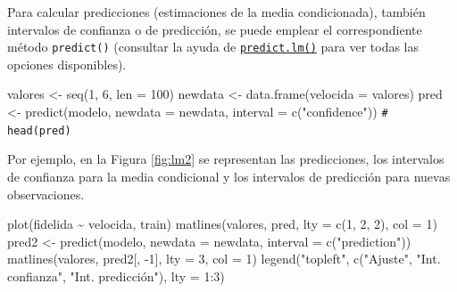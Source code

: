 \documentclass[
]{book}
\newenvironment{Shaded}{\begin{snugshade}}{\end{snugshade}}
\newcommand{\AttributeTok}[1]{\textcolor[rgb]{0.77,0.63,0.00}{#1}}
\newcommand{\CommentTok}[1]{\textcolor[rgb]{0.56,0.35,0.01}{\textit{#1}}}
\newcommand{\DecValTok}[1]{\textcolor[rgb]{0.00,0.00,0.81}{#1}}
\newcommand{\FunctionTok}[1]{\textcolor[rgb]{0.00,0.00,0.00}{#1}}
\newcommand{\NormalTok}[1]{#1}
\newcommand{\OtherTok}[1]{\textcolor[rgb]{0.56,0.35,0.01}{#1}}
\newcommand{\SpecialCharTok}[1]{\textcolor[rgb]{0.00,0.00,0.00}{#1}}
\newcommand{\StringTok}[1]{\textcolor[rgb]{0.31,0.60,0.02}{#1}}
\theoremstyle{break}
\theoremstyle{nonumberplain}
\renewcommand{\CommentTok}[1]{\textcolor[rgb]{0.41,0.41,0.41}{\texttt{#1}}}
\begin{document}
Para calcular predicciones (estimaciones de la media condicionada), también intervalos de confianza o de predicción, se puede emplear el correspondiente método \texttt{predict()} (consultar la ayuda de \href{https://rdrr.io/r/stats/predict.lm.html}{\texttt{predict.lm()}} para ver todas las opciones disponibles).

\begin{Shaded}
\begin{Highlighting}[]
\NormalTok{valores }\OtherTok{\textless{}{-}} \FunctionTok{seq}\NormalTok{(}\DecValTok{1}\NormalTok{, }\DecValTok{6}\NormalTok{, }\AttributeTok{len =} \DecValTok{100}\NormalTok{)}
\NormalTok{newdata }\OtherTok{\textless{}{-}} \FunctionTok{data.frame}\NormalTok{(}\AttributeTok{velocida =}\NormalTok{ valores)}
\NormalTok{pred }\OtherTok{\textless{}{-}} \FunctionTok{predict}\NormalTok{(modelo, }\AttributeTok{newdata =}\NormalTok{ newdata, }\AttributeTok{interval =} \FunctionTok{c}\NormalTok{(}\StringTok{"confidence"}\NormalTok{))}
\CommentTok{\# head(pred)}
\end{Highlighting}
\end{Shaded}

Por ejemplo, en la Figura \ref{fig:lm2} se representan las predicciones, los intervalos de confianza para la media condicional y los intervalos de predicción para nuevas observaciones.



\begin{Shaded}
\begin{Highlighting}[]
\FunctionTok{plot}\NormalTok{(fidelida }\SpecialCharTok{\textasciitilde{}}\NormalTok{ velocida, train)}
\FunctionTok{matlines}\NormalTok{(valores, pred, }\AttributeTok{lty =} \FunctionTok{c}\NormalTok{(}\DecValTok{1}\NormalTok{, }\DecValTok{2}\NormalTok{, }\DecValTok{2}\NormalTok{), }\AttributeTok{col =} \DecValTok{1}\NormalTok{)}
\NormalTok{pred2 }\OtherTok{\textless{}{-}} \FunctionTok{predict}\NormalTok{(modelo, }\AttributeTok{newdata =}\NormalTok{ newdata, }\AttributeTok{interval =} \FunctionTok{c}\NormalTok{(}\StringTok{"prediction"}\NormalTok{))}
\FunctionTok{matlines}\NormalTok{(valores, pred2[, }\SpecialCharTok{{-}}\DecValTok{1}\NormalTok{], }\AttributeTok{lty =} \DecValTok{3}\NormalTok{, }\AttributeTok{col =} \DecValTok{1}\NormalTok{)}
\FunctionTok{legend}\NormalTok{(}\StringTok{"topleft"}\NormalTok{, }\FunctionTok{c}\NormalTok{(}\StringTok{"Ajuste"}\NormalTok{, }\StringTok{"Int. confianza"}\NormalTok{, }\StringTok{"Int. predicción"}\NormalTok{), }\AttributeTok{lty =} \DecValTok{1}\SpecialCharTok{:}\DecValTok{3}\NormalTok{)}
\end{Highlighting}
\end{Shaded}
\end{document}
